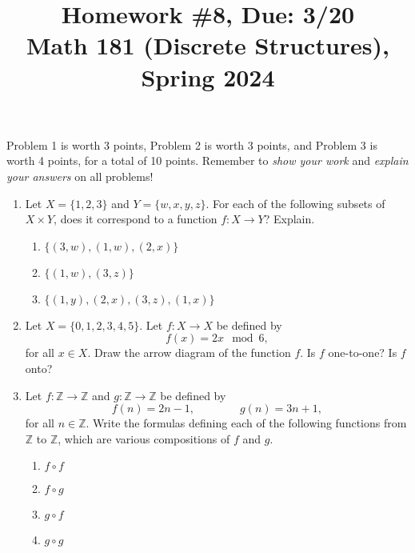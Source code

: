 \documentclass[11pt]{article}
\title{Homework \#8, Due: 3/20 \\Math 181 (Discrete Structures), Spring 2024}
\date{}
\begin{document}
\maketitle

\thispagestyle{empty}

\vspace{-1cm}

Problem 1 is worth 3 points, Problem 2 is worth 3 points, and Problem 3 is worth 4 points, for a total of 10 points. Remember to \emph{show your work} and \emph{explain your answers} on all problems!

\begin{enumerate}

\item Let $X=\{1,2,3\}$ and $Y=\{w,x,y,z\}$. For each of the following subsets of $X \times Y$, does it correspond to a function $f \colon X \to Y$? Explain.
\begin{enumerate}
\item $\{(3,w),(1,w),(2,x)\}$
\item $\{(1,w),(3,z)\}$
\item $\{(1,y),(2,x),(3,z),(1,x)\}$
\end{enumerate}

\item Let $X = \{0,1,2,3,4,5\}$. Let $f\colon X \to X$ be defined by 
\[f(x) = 2x \mod 6,\] 
for all $x \in X$. Draw the arrow diagram of the function $f$. Is $f$ one-to-one? Is $f$ onto?

\item Let $f\colon \mathbb{Z} \to \mathbb{Z}$ and $g\colon\mathbb{Z}\to \mathbb{Z}$ be defined by
\[ f(n) = 2n-1, \qquad \qquad g(n) = 3n+1,\]
for all $n \in \mathbb{Z}$. Write the formulas defining each of the following functions from $\mathbb{Z}$ to $\mathbb{Z}$, which are various compositions of $f$ and $g$.
\begin{enumerate}
\item $f \circ f$
\item $f \circ g$
\item $g \circ f$
\item $g \circ g$
\end{enumerate}

\end{enumerate}
\end{document}
